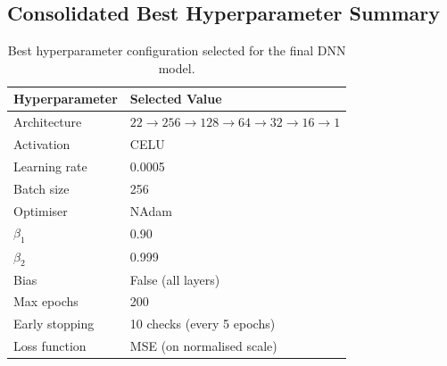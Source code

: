 \subsection{Consolidated Best Hyperparameter Summary}
\label{annexure:best_hyperparams}

\begin{table}[htbp]
\centering
\begin{tabular}{ll}
\toprule
\textbf{Hyperparameter} & \textbf{Selected Value} \\
\midrule
Architecture    & $22 \to 256 \to 128 \to 64 \to 32 \to 16 \to 1$ \\
Activation      & CELU \\
Learning rate   & 0.0005 \\
Batch size      & 256 \\
Optimiser       & NAdam \\
$\beta_1$       & 0.90 \\
$\beta_2$       & 0.999 \\
Bias            & False (all layers) \\
Max epochs      & 200 \\
Early stopping  & 10 checks (every 5 epochs) \\
Loss function   & MSE (on normalised scale) \\
\bottomrule
\end{tabular}
\caption{Best hyperparameter configuration selected for the final DNN model.}
\label{tab:best_hyperparams}
\end{table}

